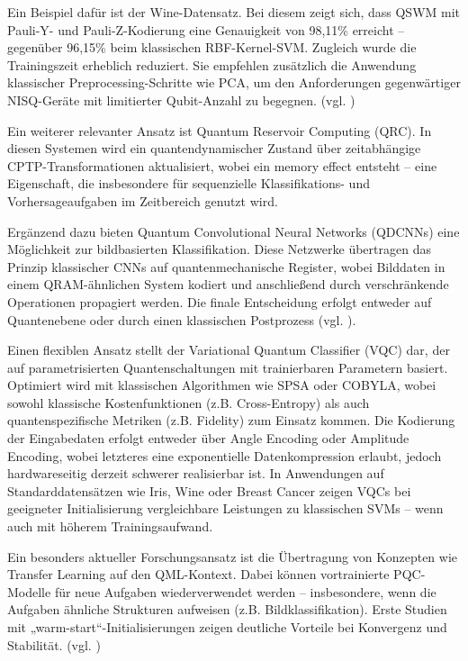 Ein Beispiel dafür ist der Wine-Datensatz. Bei diesem zeigt sich, dass QSWM mit Pauli-Y- und Pauli-Z-Kodierung eine Genauigkeit von 98{,}11\% erreicht – gegenüber 96{,}15\% beim klassischen RBF-Kernel-SVM. Zugleich wurde die Trainingszeit erheblich reduziert. Sie empfehlen zusätzlich die Anwendung klassischer Preprocessing-Schritte wie PCA, um den Anforderungen gegenwärtiger NISQ-Geräte mit limitierter Qubit-Anzahl zu begegnen. (vgl. \cite{kavithaQuantumMachineLearning2024})


Ein weiterer relevanter Ansatz ist Quantum Reservoir Computing (QRC). In diesen Systemen wird ein quantendynamischer Zustand über zeitabhängige CPTP-Transformationen aktualisiert, wobei ein memory effect entsteht – eine Eigenschaft, die insbesondere für sequenzielle Klassifikations- und Vorhersageaufgaben im Zeitbereich genutzt wird.

Ergänzend dazu bieten Quantum Convolutional Neural Networks (QDCNNs) eine Möglichkeit zur bildbasierten Klassifikation. Diese Netzwerke übertragen das Prinzip klassischer CNNs auf quantenmechanische Register, wobei Bilddaten in einem QRAM-ähnlichen System kodiert und anschließend durch verschränkende Operationen propagiert werden. Die finale Entscheidung erfolgt entweder auf Quantenebene oder durch einen klassischen Postprozess (vgl. \cite{peral-garciaSystematicLiteratureReview2024}).

Einen flexiblen Ansatz stellt der Variational Quantum Classifier (VQC) dar, der auf parametrisierten Quantenschaltungen mit trainierbaren Parametern basiert. Optimiert wird mit klassischen Algorithmen wie SPSA oder COBYLA, wobei sowohl klassische Kostenfunktionen (z.B. Cross-Entropy) als auch quantenspezifische Metriken (z.B. Fidelity) zum Einsatz kommen. Die Kodierung der Eingabedaten erfolgt entweder über Angle Encoding oder Amplitude Encoding, wobei letzteres eine exponentielle Datenkompression erlaubt, jedoch hardwareseitig derzeit schwerer realisierbar ist. In Anwendungen auf Standarddatensätzen wie Iris, Wine oder Breast Cancer zeigen VQCs bei geeigneter Initialisierung vergleichbare Leistungen zu klassischen SVMs – wenn auch mit höherem Trainingsaufwand.

Ein besonders aktueller Forschungsansatz ist die Übertragung von Konzepten wie Transfer Learning auf den QML-Kontext. Dabei können vortrainierte PQC-Modelle für neue Aufgaben wiederverwendet werden – insbesondere, wenn die Aufgaben ähnliche Strukturen aufweisen (z.B. Bildklassifikation). Erste Studien mit „warm-start“-Initialisierungen zeigen deutliche Vorteile bei Konvergenz und Stabilität. (vgl. \cite{gujjuQuantumMachineLearning2024})


